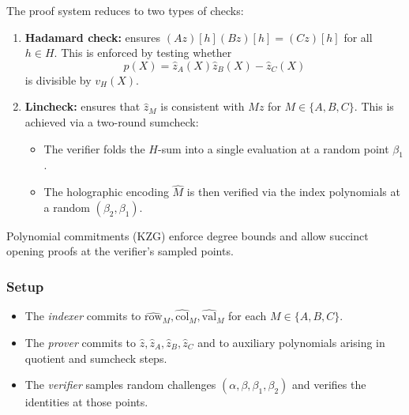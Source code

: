 The proof system reduces to two types of checks:
\begin{enumerate}
    \item \textbf{Hadamard check:} ensures $(Az)[h](Bz)[h] = (Cz)[h]$ for all $h \in H$. This is enforced by testing whether 
    \[
        p(X) = \hat z_A(X)\hat z_B(X) - \hat z_C(X)
    \]
    is divisible by $v_H(X)$.
    \item \textbf{Lincheck:} ensures that $\hat z_M$ is consistent with $Mz$ for $M \in \{A,B,C\}$. This is achieved via a two-round sumcheck:
    \begin{itemize}
        \item The verifier folds the $H$-sum into a single evaluation at a random point $\beta_1$.
        \item The holographic encoding $\hat M$ is then verified via the index polynomials at a random $(\beta_2,\beta_1)$.
    \end{itemize}
\end{enumerate}

Polynomial commitments (KZG) enforce degree bounds and allow succinct opening proofs at the verifier’s sampled points.


\subsubsection*{Setup}

\begin{itemize}
    \item The \emph{indexer} commits to $\widehat{\mathrm{row}}_M,\widehat{\mathrm{col}}_M,\widehat{\mathrm{val}}_M$ for each $M \in \{A,B,C\}$.
    \item The \emph{prover} commits to $\hat z,\hat z_A,\hat z_B,\hat z_C$ and to auxiliary polynomials arising in quotient and sumcheck steps.
    \item The \emph{verifier} samples random challenges $(\alpha,\beta,\beta_1,\beta_2)$ and verifies the identities at those points.
\end{itemize}


